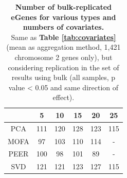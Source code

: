 



\begin{table}[h]
    \centering
    \begin{tabular}{c|c c c c c}
    &         5 & 10 & 15 & 20 & 25  \\
    \hline
    PCA   & 111 & 120 &  128 & 123 & 115 \\
    MOFA  &  97 & 103 &  110 & 114 &  -  \\
    PEER  & 100 &  98 &  101 &  89 &  -  \\
    SVD   & 121 & 121 &  123 & 127 & 115 \\
    \end{tabular}
    \caption[Covariate comparison in terms of replication of bulk results]{\textbf{Number of bulk-replicated eGenes for various types and numbers of covariates.} \\
    Same as \textbf{Table \ref{tab:covariates}} (mean as aggregation method, 1,421 chromosome 2 genes only), but considering replication in the set of results using bulk (all samples, p value < 0.05 and same direction of effect).}
    \label{tab:covariates_replication}
\end{table}

